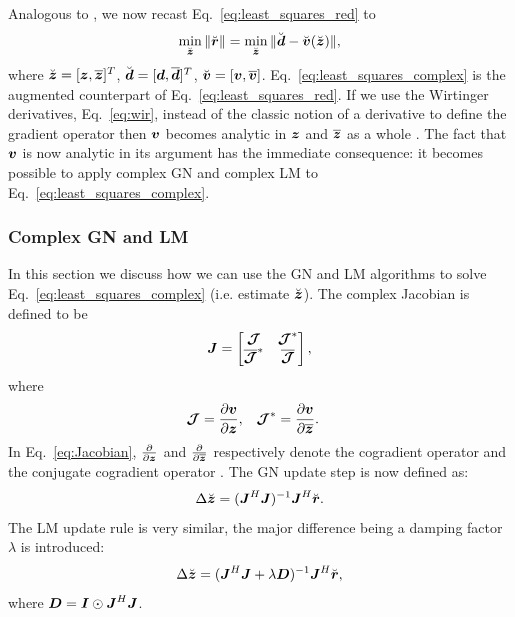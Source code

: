 \documentclass[useAMS,usenatbib]{mn2e}
\newcommand{\bz}{\bmath{z}}
\newcommand{\br}{\bmath{r}}
\newcommand{\bd}{\bmath{d}}
\newcommand{\bv}{\bmath{v}}
\newcommand{\bJ}{\bmath{J}}
\newcommand{\bD}{\bmath{D}}
\newcommand{\bI}{\bmath{I}}
\newcommand{\bmJ}{\bmath{\mathcal{J}}}
\newcommand{\conj}[1]{\overline{#1}}
\begin{document}
Analogous to \cite{Smirnov2015}, we now recast Eq.~\eqref{eq:least_squares_red} to 
\begin{equation}
\label{eq:least_squares_complex}
\min_{\breve{\bz}} \|\breve{\br}\| = \min_{\breve{\bz}} \|\breve{\bd} - \breve{\bv}(\breve{\bz})\|, 
\end{equation}
where $\breve{\bz} = [\bz,\conj{\bz}]^T$, $\breve{\bd} = [\bd,\conj{\bd}]^T$, $\breve{\bv} = [\bv,\conj{\bv}]$. Eq.~\eqref{eq:least_squares_complex} is the augmented counterpart of Eq.~\eqref{eq:least_squares_red}.
If we use the Wirtinger derivatives, Eq.~\eqref{eq:wir}, instead of the classic notion of a derivative to define the gradient operator then 
$\bv$ becomes analytic in $\bz$ and $\conj{\bz}$ as a whole \citep{Smirnov2015}. The fact that $\bv$ is now analytic in its argument has the immediate consequence: it becomes possible to apply complex GN
and complex LM to Eq.~\eqref{eq:least_squares_complex}. 

\subsubsection{Complex GN and LM}
In this section we discuss how we can use the GN and LM algorithms to solve Eq.~\eqref{eq:least_squares_complex} (i.e. estimate $\breve{\bz}$). The complex Jacobian is defined to be
\begin{equation}
\label{eq:Jacobian}
\bJ = \begin{bmatrix}
       \bmJ & \bmJ^*\\
       \conj{\bmJ}^* & \conj{\bmJ} 
      \end{bmatrix},
\end{equation}
where 
\begin{align}
\bmJ &= \frac{\partial \bv}{\partial \bz}, & \bmJ^* &= \frac{\partial \bv}{\partial \conj{\bz}}. 
\end{align}
In Eq.~\eqref{eq:Jacobian}, $\frac{\partial}{\partial \bz}$ and $\frac{\partial}{\partial \conj{\bz}}$ respectively denote the cogradient operator and the conjugate cogradient operator \citep{Sorber2012}.
The GN update step is now defined as:
\begin{equation}
\label{eq:GN_update}
 \Delta \breve{\bz} = (\bJ^H\bJ)^{-1}\bJ^H\breve{\br}.
\end{equation}
The LM update rule is very similar, the major difference being a damping factor $\lambda$ is introduced:
\begin{equation}
\label{eq:LM_update}
\Delta \breve{\bz} = (\bJ^H\bJ + \lambda\bD)^{-1}\bJ^H\breve{\br},
\end{equation}
where $\bD=\bI\odot\bJ^H\bJ$. 
\end{document}

